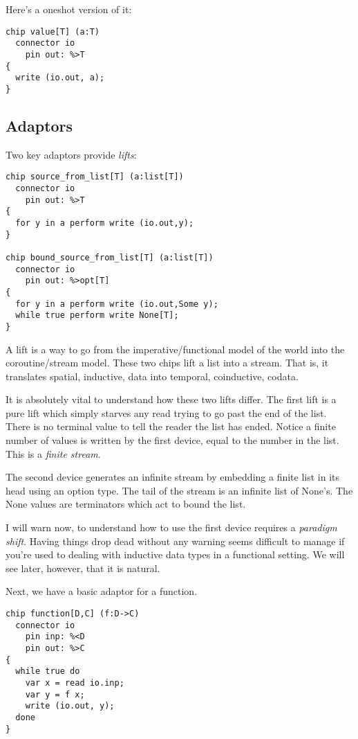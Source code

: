 \documentclass[oneside]{book}
\begin{document}
Here's a oneshot version of it:

\begin{verbatim}
chip value[T] (a:T)
  connector io 
    pin out: %>T
{
  write (io.out, a);
}
\end{verbatim}

\subsection{Adaptors}
Two key adaptors provide {\em lifts}:


\begin{verbatim}
chip source_from_list[T] (a:list[T])
  connector io
    pin out: %>T
{
  for y in a perform write (io.out,y);
}

chip bound_source_from_list[T] (a:list[T])
  connector io
    pin out: %>opt[T]
{
  for y in a perform write (io.out,Some y);
  while true perform write None[T];
}
\end{verbatim}

A lift is a way to go from the imperative/functional model
of the world into the coroutine/stream model. These
two chips lift a list into a stream. That is, it translates
spatial, inductive, data into temporal, coinductive, codata.

It is absolutely vital to understand how these two
lifts differ. The first lift is a pure lift
which simply starves any read trying to go past the
end of the list. There is no terminal value to tell the
reader the list has ended. Notice a finite number
of values is written by the first device, equal to the
number in the list. This is a {\em finite stream}.

The second device generates an infinite stream
by embedding a finite list in its head using 
an option type. The tail of the stream is an infinite
list of None's. The None values are terminators which
act to bound the list.

I will warn now, to understand how to use the first device
requires a {\em paradigm shift}. Having things drop dead without
any warning seems difficult to manage if you're used
to dealing with inductive data types in a functional
setting. We will see later, however, that it is natural.

Next, we have a basic adaptor for a function.

\begin{verbatim}
chip function[D,C] (f:D->C)
  connector io
    pin inp: %<D
    pin out: %>C
{
  while true do
    var x = read io.inp;
    var y = f x; 
    write (io.out, y);
  done
}
\end{verbatim}
\end{document}
